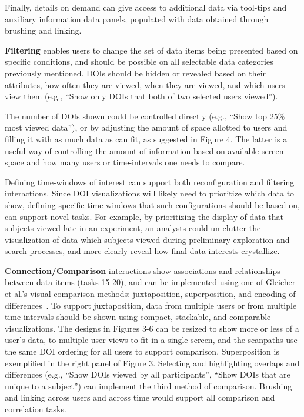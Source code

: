  Finally, details on demand can give access to additional data via tool-tips and auxiliary information data panels, populated with data obtained through brushing and linking.
  
	
\noindent \textbf{Filtering} enables users to change the set of data items being presented based on specific conditions, and should be possible on all selectable data categories previously mentioned. DOIs should be hidden or revealed based on their attributes, how often they are viewed, when they are viewed, and which users view them (e.g., ``Show only DOIs that both of two selected users viewed'').

The number of DOIs shown could be controlled directly (e.g., ``Show top $25\%$ most viewed data''), or by adjusting the amount of space allotted to users and filling it with as much data as can fit, as suggested in Figure 4. The latter is a useful way of controlling the amount of information based on available screen space and how many users or time-intervals one needs to compare.

Defining time-windows of interest can support both reconfiguration and filtering interactions. Since DOI visualizations will likely need to prioritize which data to show, defining specific time windows that such configurations should be based on, can support novel tasks. For example, by prioritizing the display of data that subjects viewed late in an experiment, an analysts could un-clutter the visualization of data which subjects viewed during preliminary exploration and search processes, and more clearly reveal how final data interests crystallize.


	
\noindent \textbf{Connection/Comparison} interactions show associations and relationships between data items (tasks 15-20), and can be implemented using one of Gleicher et al.'s visual comparison methods: juxtaposition, superposition, and encoding of differences~\cite{gleicher2011visual}. To support juxtaposition, data from multiple users or from multiple time-intervals should be shown using compact, stackable, and comparable visualizations. The designs in Figures 3-6 can be resized to show more or less of a user's data, to multiple user-views to fit in a single screen, and the scanpaths use the same DOI ordering for all users to support comparison. Superposition is exemplified in the right panel of Figure 3. Selecting and highlighting overlaps and differences (e.g., ``Show DOIs viewed by all participants'', ``Show DOIs that are unique to a subject'') can implement the third method of comparison. Brushing and linking across users and across time would support all comparison and correlation tasks.


